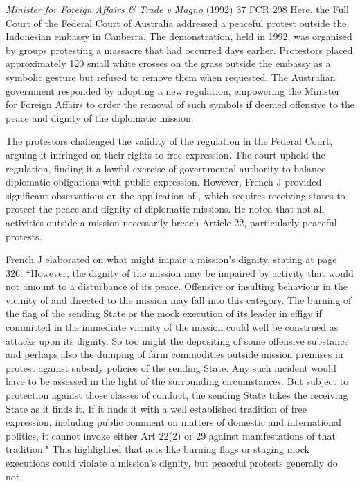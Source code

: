 \begin{casedetails}{\textit{Minister for Foreign Affairs \& Trade v Magno} (1992) 37 FCR 298}
    \flushleft
    Here, the Full Court of the Federal Court of Australia addressed a peaceful protest outside the Indonesian embassy in Canberra. The demonstration, held in 1992, was organised by groups protesting a massacre that had occurred days earlier. Protestors placed approximately 120 small white crosses on the grass outside the embassy as a symbolic gesture but refused to remove them when requested. The Australian government responded by adopting a new regulation, empowering the Minister for Foreign Affairs to order the removal of such symbols if deemed offensive to the peace and dignity of the diplomatic mission.

    \vspace{\baselineskip}

    The protestors challenged the validity of the regulation in the Federal Court, arguing it infringed on their rights to free expression. The court upheld the regulation, finding it a lawful exercise of governmental authority to balance diplomatic obligations with public expression. However, French J provided significant observations on the application of , which requires receiving states to protect the peace and dignity of diplomatic missions. He noted that not all activities outside a mission necessarily breach Article 22, particularly peaceful protests.

    \vspace{\baselineskip}

    French J elaborated on what might impair a mission's dignity, stating at page 326: ``However, the dignity of the mission may be impaired by activity that would not amount to a disturbance of its peace. Offensive or insulting behaviour in the vicinity of and directed to the mission may fall into this category. The burning of the flag of the sending State or the mock execution of its leader in effigy if committed in the immediate vicinity of the mission could well be construed as attacks upon its dignity. So too might the depositing of some offensive substance and perhaps also the dumping of farm commodities outside mission premises in protest against subsidy policies of the sending State. Any such incident would have to be assessed in the light of the surrounding circumstances. But subject to protection against those classes of conduct, the sending State takes the receiving State as it finds it. If it finds it with a well established tradition of free expression, including public comment on matters of domestic and international politics, it cannot invoke either Art 22(2) or 29 against manifestations of that tradition." This highlighted that acts like burning flags or staging mock executions could violate a mission's dignity, but peaceful protests generally do not.


\end{casedetails}
